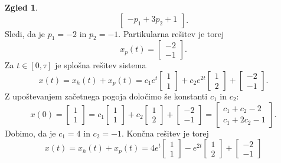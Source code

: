 \documentclass[12pt,a4paper]{amsart}
\theoremstyle{definition} %
\newtheorem{zgled}[definicija]{Zgled}
\theoremstyle{plain} %
\begin{document}
\begin{zgled}
\[\begin{bmatrix}
        -p_1+3p_2+1  
    \end{bmatrix}.\]
    Sledi, da je $p_1=-2$ in $p_2=-1$. Partikularna rešitev je torej
    \[x_p(t)=
    \begin{bmatrix}
        -2  \\
        -1  
    \end{bmatrix}.\]
    Za $t\in[0,\tau]$ je splošna rešitev sistema
    \[x(t)=x_h(t)+x_p(t)= c_1e^t\begin{bmatrix}
        1 \\
        1 
    \end{bmatrix}
    +c_2e^{2t}\begin{bmatrix}
        1 \\
        2 
    \end{bmatrix} + \begin{bmatrix}
        -2  \\
        -1  
    \end{bmatrix}.\]
    Z upoštevanjem začetnega pogoja določimo še konstanti $c_1$ in $c_2$:
    \[x(0)=\begin{bmatrix}
        1  \\
        1  
    \end{bmatrix} = c_1 \begin{bmatrix}
        1  \\
        1  
    \end{bmatrix} + c_2 \begin{bmatrix}
        1  \\
        2  
    \end{bmatrix} + \begin{bmatrix}
        -2  \\
        -1  
    \end{bmatrix} = \begin{bmatrix}
        c_1 + c_2 -2  \\
        c_1+2c_2 -1  
    \end{bmatrix}.\]
    Dobimo, da je $c_1=4$ in $c_2=-1$. Končna rešitev je torej 
    \[x(t)=x_h(t)+x_p(t)= 4e^t\begin{bmatrix}
        1 \\
        1 
    \end{bmatrix}
    -e^{2t}\begin{bmatrix}
        1 \\
        2 
    \end{bmatrix} + \begin{bmatrix}
        -2  \\
        -1  

\end{bmatrix}\]
\end{zgled}
\end{document}
